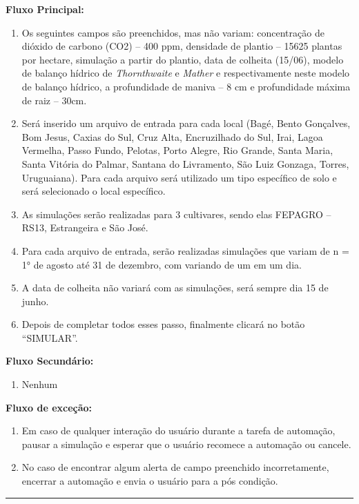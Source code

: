 \documentclass[tg]{mdtufsm}
\begin{document}
            	{\bf Fluxo Principal:}
                	\begin{enumerate}
                		\item Os seguintes campos são preenchidos, mas não variam: concentração de dióxido de carbono (CO2) – 400 ppm, densidade de plantio – 15625 plantas por hectare, simulação a partir do plantio, data de colheita (15/06), modelo de balanço hídrico de \emph{Thornthwaite} e \emph{Mather} e respectivamente neste modelo de balanço hídrico, a profundidade de maniva – 8 cm e profundidade máxima de raiz – 30cm.
                		\item Será inserido um arquivo de entrada para cada local (Bagé, Bento Gonçalves, Bom Jesus, Caxias do Sul, Cruz Alta, Encruzilhado do Sul, Irai, Lagoa Vermelha, Passo Fundo, Pelotas, Porto Alegre, Rio Grande, Santa Maria, Santa Vitória do Palmar, Santana do Livramento, São Luiz Gonzaga, Torres, Uruguaiana). Para cada arquivo será utilizado um tipo específico de solo e será selecionado o local específico.
                		\item As simulações serão realizadas para 3 cultivares, sendo elas FEPAGRO – RS13, Estrangeira e São José.
                		\item Para cada arquivo de entrada, serão realizadas simulações que variam de n = 1° de agosto até 31 de dezembro, com variando de um em um dia.
                		\item A data de colheita não variará com as simulações, será sempre dia 15 de junho.
                		\item Depois de completar todos esses passo, finalmente clicará no botão “SIMULAR”.
                	\end{enumerate}

                {\bf Fluxo Secundário:}
                	\begin{enumerate}
                		\item Nenhum
                	\end{enumerate}

                {\bf Fluxo de exceção:}
                	\begin{enumerate}
                		\item Em caso de qualquer interação do usuário durante a tarefa de automação, pausar a simulação e esperar que o usuário recomece a automação ou cancele.
                		\item No caso de encontrar algum alerta de campo preenchido incorretamente, encerrar a automação e envia o usuário para a pós condição.
                	\end{enumerate}
                    \bigskip \hrule
\end{document}
